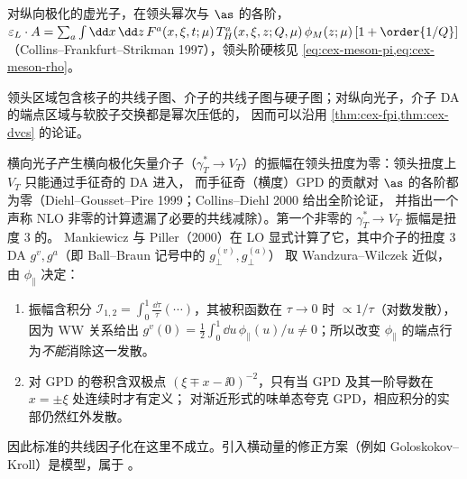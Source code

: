 \begin{theorem}[纵向光子的硬介子电产生]\tagA\label{thm:cex-cfs}
对纵向极化的虚光子，在领头幂次与 $\as$ 的各阶，$\varepsilon_L\cdot A=\sum_{a}\int\dd x\,\dd z\,F^a(x,\xi,t;\mu)\,T_H^a(x,\xi,z;Q,\mu)\,\phi_M(z;\mu)\,[1+\order{1/Q}]$
（Collins--Frankfurt--Strikman 1997），领头阶硬核见 \cref{eq:cex-meson-pi,eq:cex-meson-rho}。
\end{theorem}

\begin{proofsketch}
领头区域包含核子的共线子图、介子的共线子图与硬子图；对纵向光子，介子 DA 的端点区域与软胶子交换都是幂次压低的，
因而可以沿用 \cref{thm:cex-fpi,thm:cex-dvcs} 的论证。
\end{proofsketch}

\begin{remark}\tagV\label{rem:cex-transverse}
横向光子产生横向极化矢量介子（$\gamma^*_T\to V_T$）的振幅在领头扭度为零：领头扭度上 $V_T$ 只能通过手征奇的 DA 进入，
而手征奇（横度）GPD 的贡献对 $\as$ 的各阶都为零（Diehl--Gousset--Pire 1999；Collins--Diehl 2000 给出全阶论证，
并指出一个声称 NLO 非零的计算遗漏了必要的共线减除）。第一个非零的 $\gamma^*_T\to V_T$ 振幅是扭度 3 的。
Mankiewicz 与 Piller（2000）在 LO 显式计算了它，其中介子的扭度 3 DA $g^v,g^a$（即 Ball--Braun 记号中的 $g_\perp^{(v)},g_\perp^{(a)}$）
取 Wandzura--Wilczek 近似，由 $\phi_\parallel$ 决定：
\begin{enumerate}[label=(\roman*)]
\item 振幅含积分 $\mathcal I_{1,2}=\int_0^1\frac{\dd\tau}{\tau}(\cdots)$，其被积函数在 $\tau\to0$ 时 $\propto1/\tau$（对数发散），因为 WW 关系给出
$g^v(0)=\frac12\int_0^1\dd u\,\phi_\parallel(u)/u\neq0$；所以改变 $\phi_\parallel$ 的端点行为\emph{不能}消除这一发散。
\item 对 GPD 的卷积含双极点 $(\xi\mp x-\ii0)^{-2}$，只有当 GPD 及其一阶导数在 $x=\pm\xi$ 处连续时才有定义；
对渐近形式的味单态夸克 GPD，相应积分的实部仍然红外发散。
\end{enumerate}
因此标准的共线因子化在这里不成立。引入横动量的修正方案（例如 Goloskokov--Kroll）是模型，属于 \tagP。
\end{remark}
